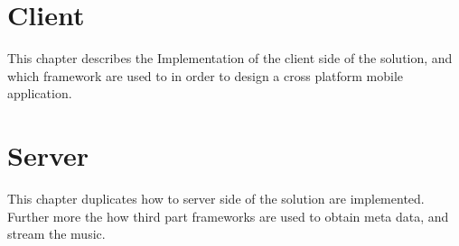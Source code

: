 




\chapter{Client}

This chapter describes the Implementation of the client side of the solution, and which framework are used to in order to design a cross platform mobile application. 



\chapter{Server}

This chapter duplicates how to server side of the solution are implemented. Further more the how third part frameworks are used to obtain meta data, and stream the music. 














